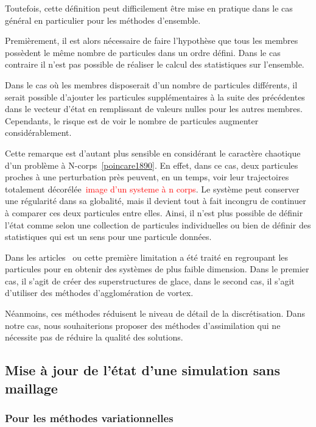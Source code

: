 Toutefois, cette définition peut difficilement être mise en pratique dans le cas général en particulier pour les méthodes d'ensemble.

Premièrement, il est alors nécessaire de faire l'hypothèse que tous les membres possèdent le même nombre de particules dans un ordre défini.
Dans le cas contraire il n'est pas possible de réaliser le calcul des statistiques sur l'ensemble.

Dans le cas où les membres disposerait d'un nombre de particules différents, il serait possible d'ajouter les particules supplémentaires à la suite des précédentes dans le vecteur d'état en remplissant de valeurs nulles pour les autres membres. Cependants, le risque est de voir le nombre de particules augmenter considérablement.

Cette remarque est d'autant plus sensible en considérant le caractère chaotique d'un problème à N-corps~\ref{poincare1890}. En effet, dans ce cas, deux particules proches à une perturbation près peuvent, en un temps, voir leur trajectoires totalement décorélée~\textcolor{red}{image d'un systeme à n corps}. Le système peut conserver une régularité dans sa globalité, mais il devient tout à fait incongru de continuer à comparer ces deux particules entre elles. Ainsi, il n'est plus possible de définir l'état comme selon une collection de particules individuelles ou bien de définir des statistiques qui est un sens pour une particule données.

Dans les articles~\cite{chen_superfloe_2022} ou \cite{darakananda_data-assimilated_2018} cette première limitation a été traité en regroupant les particules pour en obtenir des systèmes de plus faible dimension. Dans le premier cas, il s'agit de créer des superstructures de glace, dans le second cas, il s'agit d'utiliser des méthodes d'agglomération de vortex.

Néanmoins, ces méthodes réduisent le niveau de détail de la discrétisation. Dans notre cas, nous souhaiterions proposer des méthodes d'assimilation qui ne nécessite pas de réduire la qualité des solutions.

\subsection{Mise à jour de l'état d'une simulation sans maillage}

\subsubsection{Pour les méthodes variationnelles}

